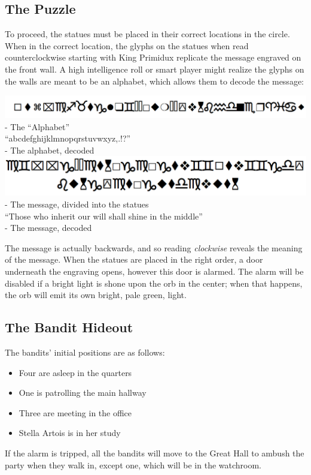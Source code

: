 \subsection{The Puzzle}
To proceed, the statues must be placed in their correct locations in the circle. When in the correct location, the glyphs on the statues when read counterclockwise starting with King Primidux replicate the message engraved on the front wall. A high intelligence roll or smart player might realize the glyphs on the walls are meant to be an alphabet, which allows them to decode the message:
\begin{center}
\includegraphics[scale=0.5]{combats/alphabet.PNG}\\
- The ``Alphabet''\\

``abcdefghijklmnopqrstuvwxyz,.!?''\\
- The alphabet, decoded\\

\includegraphics[scale=0.5]{combats/message.PNG}\\
- The message, divided into the statues \\

``Those who inherit our will shall shine in the middle''\\
- The message, decoded
\end{center}

The message is actually backwards, and so reading \textit{clockwise} reveals the meaning of the message. When the statues are placed in the right order, a door underneath the engraving opens, however this door is alarmed. The alarm will be disabled if a bright light is shone upon the orb in the center; when that happens, the orb will emit its own bright, pale green, light.

\subsection{The Bandit Hideout}
The bandits' initial positions are as follows:
\begin{itemize}
\item Four are asleep in the quarters
\item One is patrolling the main hallway
\item Three are meeting in the office
\item Stella Artois is in her study
\end{itemize}
If the alarm is tripped, all the bandits will move to the Great Hall to ambush the party when they walk in, except one, which will be in the watchroom.